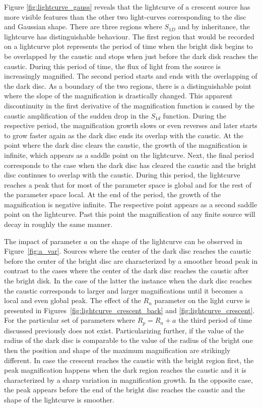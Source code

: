 \documentclass[usenatbib]{mn2e}
\begin{document}
Figure \ref{fig:lightcurve_gauss} reveals that the 
lightcurve of a crescent source has more
visible features than the other two light-curves corresponding to the
disc and Gaussian shape. There are three regions where $S_{1D}$ and by
inheritance, the lightcurve has distinguishable behaviour. The first
region that would be recorded on a lightcurve plot represents the
period of time when the bright disk begins to be overlapped by the
caustic and stops when just before the dark disk reaches the
caustic. During this period of time, the flux of light from the source
is increasingly magnified. The second period starts and ends with the
overlapping of the dark disc. As a boundary of the two regions, there
is a distinguishable point where the slope of the magnification is
drastically changed. This apparent discontinuity in the first
derivative of the magnification function is caused by the caustic
amplification of the sudden drop in the $S_{1d}$ function. During the
respective period, the magnification growth slows or even reverses
and later starts to grow faster again as
the dark disc ends its overlap with the caustic. At the point where
the dark disc clears the caustic, the growth of the magnification is
infinite, which appears as a saddle point on the lightcurve. Next, the
final period corresponds to the case when the dark disc has cleared
the caustic and the bright disc continues to overlap with the
caustic. During this period, the lightcurve reaches a peak that for
most of the parameter space is global and for the rest of the
parameter space local.  At the end of the period, the growth of the
magnification is negative infinite. The respective point appears as a
second saddle point on the lightcurve. Past this point the
magnification of any finite source will decay in roughly the same
manner.

The impact of parameter $a$ on the shape of the lightcurve can be
observed in Figure~\ref{fig:a_var}. Sources where the center of the
dark disc reaches the caustic before the center of the bright disc are
characterized by a smoother broad peak in contrast to the cases where
the center of the dark disc reaches the caustic after the bright disk.
In the case of the latter the instance when the dark disc reaches the
caustic corresponds to larger and larger magnifications until it
becomes a local and even global peak. The effect of the $R_n$
parameter on the light curve is presented in
Figures~\ref{fig:lightcurve_crescent_back} and
\ref{fig:lightcurve_crescent}. For the particular set of
parameters where $R_p = R_n +a$ the third period of time discussed
previously does not exist. Particularizing further, if the value of
the radius of the dark disc is comparable to the value of the radius
of the bright one then the position and shape of the maximum
magnification are strikingly different. In case the crescent reaches
the caustic with the bright region first, the peak magnification
happens when the dark region reaches the caustic and it is
characterized by a sharp variation in magnification growth. In the
opposite case, the peak appears before the end of the bright disc
reaches the caustic and the shape of the lightcurve is smoother.
\end{document}
